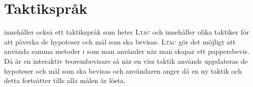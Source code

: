 
\section{Taktikspråk}
\coq innehåller också ett taktikspråk som heter \textsc{Ltac} och innehåller
olika taktiker för att påverka de hypoteser och mål som ska bevisas.
\textsc{Ltac} gör det möjligt att använda samma metoder i \coq som man använder
när man skapar ett pappersbevis. Då \coq är en interaktiv teorembevisare så när
en viss taktik används uppdateras de hypoteser och mål som ska bevisas och
användaren anger då en ny taktik och detta fortsätter tills alla målen är
lösta.
